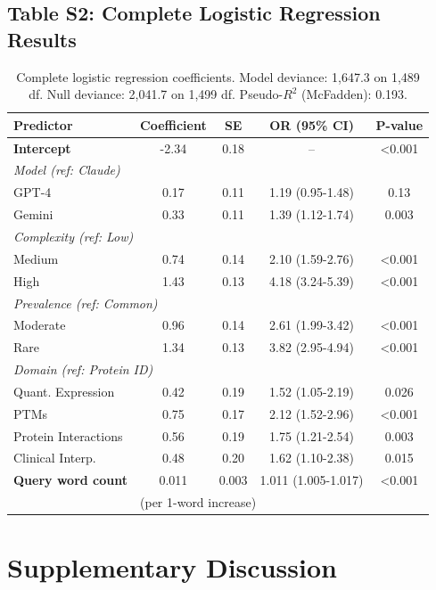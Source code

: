 \documentclass[11pt,a4paper]{article}
\begin{document}
\subsection{Table S2: Complete Logistic Regression Results}

\begin{table}[H]
\centering
\begin{tabular}{lcccc}
\toprule
\textbf{Predictor} & \textbf{Coefficient} & \textbf{SE} & \textbf{OR (95\% CI)} & \textbf{P-value} \\
\midrule
\textbf{Intercept} & -2.34 & 0.18 & -- & <0.001 \\
\midrule
\multicolumn{5}{l}{\textit{Model (ref: Claude)}} \\
\quad GPT-4 & 0.17 & 0.11 & 1.19 (0.95-1.48) & 0.13 \\
\quad Gemini & 0.33 & 0.11 & 1.39 (1.12-1.74) & 0.003 \\
\midrule
\multicolumn{5}{l}{\textit{Complexity (ref: Low)}} \\
\quad Medium & 0.74 & 0.14 & 2.10 (1.59-2.76) & <0.001 \\
\quad High & 1.43 & 0.13 & 4.18 (3.24-5.39) & <0.001 \\
\midrule
\multicolumn{5}{l}{\textit{Prevalence (ref: Common)}} \\
\quad Moderate & 0.96 & 0.14 & 2.61 (1.99-3.42) & <0.001 \\
\quad Rare & 1.34 & 0.13 & 3.82 (2.95-4.94) & <0.001 \\
\midrule
\multicolumn{5}{l}{\textit{Domain (ref: Protein ID)}} \\
\quad Quant. Expression & 0.42 & 0.19 & 1.52 (1.05-2.19) & 0.026 \\
\quad PTMs & 0.75 & 0.17 & 2.12 (1.52-2.96) & <0.001 \\
\quad Protein Interactions & 0.56 & 0.19 & 1.75 (1.21-2.54) & 0.003 \\
\quad Clinical Interp. & 0.48 & 0.20 & 1.62 (1.10-2.38) & 0.015 \\
\midrule
\textbf{Query word count} & 0.011 & 0.003 & 1.011 (1.005-1.017) & <0.001 \\
 & \multicolumn{4}{l}{(per 1-word increase)} \\
\bottomrule
\end{tabular}
\caption{Complete logistic regression coefficients. Model deviance: 1,647.3 on 1,489 df. Null deviance: 2,041.7 on 1,499 df. Pseudo-$R^2$ (McFadden): 0.193.}
\end{table}

\section{Supplementary Discussion}
\end{document}
